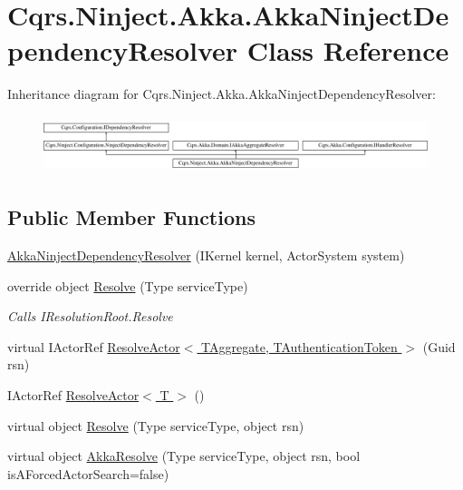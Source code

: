 \hypertarget{classCqrs_1_1Ninject_1_1Akka_1_1AkkaNinjectDependencyResolver}{}\section{Cqrs.\+Ninject.\+Akka.\+Akka\+Ninject\+Dependency\+Resolver Class Reference}
\label{classCqrs_1_1Ninject_1_1Akka_1_1AkkaNinjectDependencyResolver}
Inheritance diagram for Cqrs.\+Ninject.\+Akka.\+Akka\+Ninject\+Dependency\+Resolver\+:\begin{figure}[H]
\begin{center}
\leavevmode
\includegraphics[height=1.676647cm]{classCqrs_1_1Ninject_1_1Akka_1_1AkkaNinjectDependencyResolver}
\end{center}
\end{figure}
\subsection*{Public Member Functions}
\begin{DoxyCompactItemize}
\item 
\hyperlink{classCqrs_1_1Ninject_1_1Akka_1_1AkkaNinjectDependencyResolver_a7fdff6e54ac903d86bb79bf5536f8820_a7fdff6e54ac903d86bb79bf5536f8820}{Akka\+Ninject\+Dependency\+Resolver} (I\+Kernel kernel, Actor\+System system)
\item 
override object \hyperlink{classCqrs_1_1Ninject_1_1Akka_1_1AkkaNinjectDependencyResolver_adace29de71f10e34e952bd41e48106a6_adace29de71f10e34e952bd41e48106a6}{Resolve} (Type service\+Type)
\begin{DoxyCompactList}\small\item\em Calls I\+Resolution\+Root.\+Resolve \end{DoxyCompactList}\item 
virtual I\+Actor\+Ref \hyperlink{classCqrs_1_1Ninject_1_1Akka_1_1AkkaNinjectDependencyResolver_ab5ba20875aab8764bbb7d6df61722436_ab5ba20875aab8764bbb7d6df61722436}{Resolve\+Actor$<$ T\+Aggregate, T\+Authentication\+Token $>$} (Guid rsn)
\item 
I\+Actor\+Ref \hyperlink{classCqrs_1_1Ninject_1_1Akka_1_1AkkaNinjectDependencyResolver_a6c3399c949a77457456d77688eb66054_a6c3399c949a77457456d77688eb66054}{Resolve\+Actor$<$ T $>$} ()
\item 
virtual object \hyperlink{classCqrs_1_1Ninject_1_1Akka_1_1AkkaNinjectDependencyResolver_ab860d9bcf44b62098a8df91bbcb5013d_ab860d9bcf44b62098a8df91bbcb5013d}{Resolve} (Type service\+Type, object rsn)
\item 
virtual object \hyperlink{classCqrs_1_1Ninject_1_1Akka_1_1AkkaNinjectDependencyResolver_a8e55618bf89a2c14bc3d0e7b3253f17d_a8e55618bf89a2c14bc3d0e7b3253f17d}{Akka\+Resolve} (Type service\+Type, object rsn, bool is\+A\+Forced\+Actor\+Search=false)
\end{DoxyCompactItemize}
